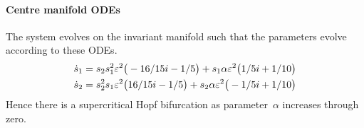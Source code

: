 \paragraph{Centre manifold ODEs} 
The system evolves on the invariant manifold such
that the parameters evolve according to these ODEs.
\begin{align*}&
\dot s_{1}=s_{2} s_{1}^{2} \varepsilon^{2} \big(-16/15 i-1/5\big)+s_{1} \alpha 
 \varepsilon^{2} \big(1/5 i+1/10\big)
\\&
\dot s_{2}=s_{2}^{2} s_{1} \varepsilon^{2} \big(16/15 i-1/5\big)+s_{2} \alpha  
\varepsilon^{2} \big(-1/5 i+1/10\big)
\end{align*}
Hence there is a supercritical Hopf bifurcation as parameter~\(\alpha\) increases through zero.


